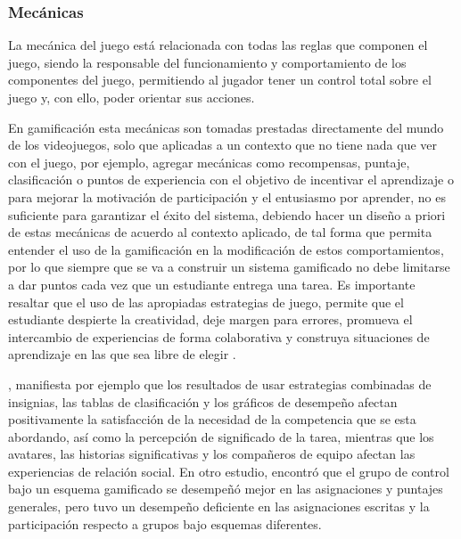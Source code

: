 \subsubsection{Mecánicas \label{sec:mecanicas}}

La mecánica del juego está relacionada con todas las reglas que componen el juego, siendo la responsable del
funcionamiento y comportamiento de los componentes del juego, permitiendo al jugador tener un control total 
sobre el juego y, con ello, poder orientar sus acciones.

En gamificación esta mecánicas son tomadas prestadas directamente del mundo de los videojuegos, solo que
aplicadas a un contexto que no tiene nada que ver con el juego, por ejemplo, agregar mecánicas como 
recompensas, puntaje, clasificación o puntos de experiencia con el objetivo de incentivar el aprendizaje o 
para mejorar la motivación de participación y el entusiasmo por aprender, no es suficiente para garantizar
el éxito del sistema, debiendo hacer un diseño a priori de estas mecánicas de acuerdo al contexto aplicado,
de tal forma que permita entender el uso de la gamificación en la modificación de estos comportamientos, por 
lo que siempre que se va a construir un sistema gamificado no debe limitarse a dar puntos cada vez que un
estudiante entrega una tarea. Es importante resaltar que el uso de las apropiadas estrategias de juego, 
permite que el estudiante despierte la creatividad, deje margen para errores, promueva el intercambio de 
experiencias de forma colaborativa y construya situaciones de aprendizaje en las que sea libre de elegir
\cite{DAROCHASEIXAS201648}.

, manifiesta por ejemplo que los resultados de usar estrategias combinadas de insignias, 
las tablas de clasificación y los gráficos de desempeño afectan positivamente la satisfacción de la necesidad
de la competencia que se esta abordando, así como la percepción de significado de la tarea, mientras que los 
avatares, las historias significativas y los compañeros de equipo afectan las experiencias de relación social. 
En otro estudio,  encontró que el grupo de control bajo un esquema gamificado se desempeñó 
mejor en las asignaciones y puntajes generales, pero tuvo un desempeño deficiente en las asignaciones escritas 
y la participación respecto a grupos bajo esquemas diferentes.

